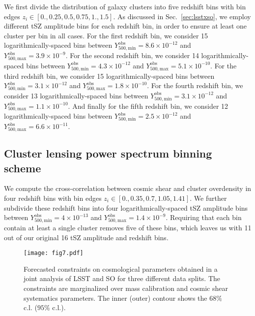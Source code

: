 \documentclass[%
 reprint,
nofootinbib,
 amsmath,amssymb,
 aps,
]{revtex4-1}
\begin{document}
We first divide the distribution of galaxy clusters into five redshift bins with bin edges $z_{i} \in [0., 0.25, 0.5, 0.75, 1., 1.5]$. As discussed in Sec.~\ref{sec:lsstxso}, we employ different tSZ amplitude bins for each redshift bin, in order to ensure at least one cluster per bin in all cases. For the first redshift bin, we consider 15 logarithmically-spaced bins between $Y^{\mathrm{obs}}_{500, \mathrm{min}} = 8.6\times 10^{-12}$ and $Y^{\mathrm{obs}}_{500, \mathrm{max}} = 3.9\times 10^{-9}$. For the second redshift bin, we consider 14 logarithmically-spaced bins between $Y^{\mathrm{obs}}_{500, \mathrm{min}} = 4.3\times 10^{-12}$ and $Y^{\mathrm{obs}}_{500, \mathrm{max}} = 5.1\times 10^{-10}$. For the third redshift bin, we consider 15 logarithmically-spaced bins between $Y^{\mathrm{obs}}_{500, \mathrm{min}} = 3.1\times 10^{-12}$ and $Y^{\mathrm{obs}}_{500, \mathrm{max}} = 1.8\times 10^{-10}$. For the fourth redshift bin, we consider 13 logarithmically-spaced bins between $Y^{\mathrm{obs}}_{500, \mathrm{min}} = 3.1\times 10^{-12}$ and $Y^{\mathrm{obs}}_{500, \mathrm{max}} = 1.1\times 10^{-10}$. And finally for the fifth redshift bin, we consider 12 logarithmically-spaced bins between $Y^{\mathrm{obs}}_{500, \mathrm{min}} = 2.5\times 10^{-12}$ and $Y^{\mathrm{obs}}_{500, \mathrm{max}} = 6.6\times 10^{-11}$.

\subsection{Cluster lensing power spectrum binning scheme}\label{ap:sec:implementation.clust-lens}

We compute the cross-correlation between cosmic shear and cluster overdensity in four redshift bins with bin edges $z_{i} \in [0., 0.35, 0.7, 1.05, 1.41]$. We further subdivide these redshift bins into four logarithmically-spaced tSZ amplitude bins between $Y^{\mathrm{obs}}_{500, \mathrm{min}} = 4\times 10^{-13}$ and $Y^{\mathrm{obs}}_{500, \mathrm{max}} = 1.4\times 10^{-9}$. Requiring that each bin contain at least a single cluster removes five of these bins, which leaves us with 11 out of our original 16 tSZ amplitude and redshift bins.

\begin{figure*}
\begin{center}
\texttt{[image: fig7.pdf]}
 \caption{Forecasted constraints on cosmological parameters obtained in a joint analysis of LSST and SO for three different data splits. The constraints are marginalized over mass calibration and cosmic shear systematics parameters. The inner (outer) contour shows the $68 \%$ c.l. ($95 \%$ c.l.).}
\label{fig:constraints-data-splits-cosmo}
\end{center}
\end{figure*}
\end{document}
